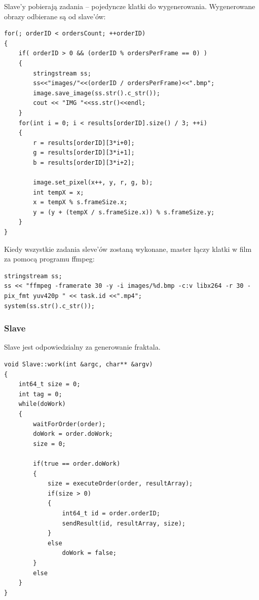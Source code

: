 \documentclass[a4paper]{article}
\begin{document}
Slave'y pobierają zadania -- pojedyncze klatki do wygenerowania. Wygenerowane obrazy odbierane są od slave'ów:

\begin{lstlisting}
for(; orderID < ordersCount; ++orderID)
{
	if( orderID > 0 && (orderID % ordersPerFrame == 0) )
	{
		stringstream ss;
	 	ss<<"images/"<<(orderID / ordersPerFrame)<<".bmp";
		image.save_image(ss.str().c_str());
		cout << "IMG "<<ss.str()<<endl;
	}
	for(int i = 0; i < results[orderID].size() / 3; ++i)
	{
		r = results[orderID][3*i+0];
		g = results[orderID][3*i+1];
		b = results[orderID][3*i+2];

		image.set_pixel(x++, y, r, g, b);
		int tempX = x;
		x = tempX % s.frameSize.x;
		y = (y + (tempX / s.frameSize.x)) % s.frameSize.y;
	}
}
\end{lstlisting}

Kiedy wszystkie zadania sleve'ów zostaną wykonane, master łączy klatki w film za pomocą programu ffmpeg:

\begin{lstlisting}
stringstream ss;
ss << "ffmpeg -framerate 30 -y -i images/%d.bmp -c:v libx264 -r 30 -pix_fmt yuv420p " << task.id <<".mp4";
system(ss.str().c_str());
\end{lstlisting}

\subsubsection{Slave}
Slave jest odpowiedzialny za generowanie fraktala.

\begin{lstlisting}
void Slave::work(int &argc, char** &argv)
{
	int64_t size = 0;
	int tag = 0;
	while(doWork)
	{
		waitForOrder(order);
		doWork = order.doWork;
		size = 0;
		
		if(true == order.doWork)
		{
			size = executeOrder(order, resultArray);
			if(size > 0)
			{
				int64_t id = order.orderID;
				sendResult(id, resultArray, size);
			}
			else
				doWork = false;
		}
		else
	}
}
\end{lstlisting}
\end{document}
